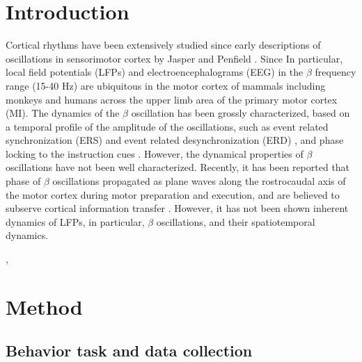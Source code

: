 \documentclass[letterpaper, 9pt, conference]{ieeeconf}
\begin{document}
\section{Introduction}
Cortical rhythms have been extensively studied since early descriptions of oscillations in sensorimotor cortex by Jasper and Penfield \cite{jasper1949}. Since In particular, local field potentials (LFPs)
and electroencephalograms (EEG) in the $\beta$ frequency range (15-40 Hz) are ubiquitous in the motor cortex of mammals including monkeys and humans across the upper limb area of the primary motor cortex (MI). The dynamics of the $\beta$ oscillation has been grossly characterized, based on a temporal profile of the amplitude of the oscillations, such as event related synchronization (ERS) and event related desynchronization (ERD) \cite{neuper2001, Jurkiewicz20061281}, and phase locking to the instruction cues \cite{jake2011}. However, the dynamical properties of $\beta$ oscillations have not been well characterized. Recently, it has been reported that phase of $\beta$ oscillations propagated as plane waves along the rostrocaudal
axis of the motor cortex during motor preparation and execution, and are
believed to subserve cortical information transfer
\cite{doug2006betawave}. However, it has not been shown inherent dynamics of LFPs, in particular, $\beta$ oscillations, and their spatiotemporal dynamics. 






\cite{doug2006betawave}, \cite{taka2011humanbetawave}

\section{Method}
\label{sec:method}

\subsection{Behavior task and data collection}
\end{document}
